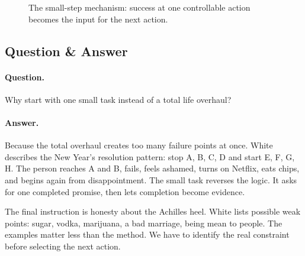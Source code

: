 \begin{figure}
\centering
{}
\caption{The small-step mechanism: success at one controllable action becomes the input for the next action.}
\end{figure}

\subsection{Question \& Answer}

\paragraph{Question.}
Why start with one small task instead of a total life overhaul?

\paragraph{Answer.}
Because the total overhaul creates too many failure points at once. White describes the New Year's resolution pattern: stop A, B, C, D and start E, F, G, H. The person reaches A and B, fails, feels ashamed, turns on Netflix, eats chips, and begins again from disappointment. The small task reverses the logic. It asks for one completed promise, then lets completion become evidence.

The final instruction is honesty about the Achilles heel. White lists possible weak points: sugar, vodka, marijuana, a bad marriage, being mean to people. The examples matter less than the method. We have to identify the real constraint before selecting the next action.

